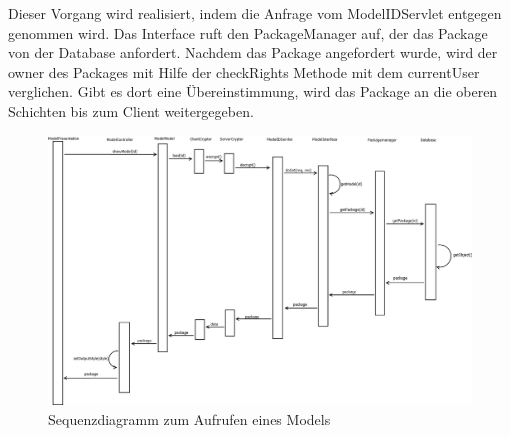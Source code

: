 \documentclass[oneside]{book}
\begin{document}
Dieser Vorgang wird realisiert, indem die Anfrage vom ModelIDServlet entgegen genommen wird. Das Interface ruft den PackageManager auf, der das Package von der Database anfordert. Nachdem das Package angefordert wurde, wird der owner des Packages mit Hilfe der checkRights Methode mit dem currentUser verglichen. Gibt es dort eine \"Ubereinstimmung, wird das Package an die oberen Schichten bis zum Client weitergegeben. 
\begin{figure}[ht]
	\centering
	\includegraphics[scale=0.3]{sequenz.png}
	\caption{Sequenzdiagramm zum Aufrufen eines Models}
\end{figure}
\end{document}
